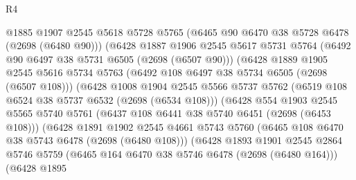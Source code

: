 \begin{lexlean}{R4}
\begin{coremodule}
                            @1885
                            @1907
                            @2545
                            @5618
                            @5728
                            @5765
                            (@6465 @90 @6470 @38 @5728 @6478 (@2698 (@6480 @90)))
                            (@6428
                              @1887
                              @1906
                              @2545
                              @5617
                              @5731
                              @5764
                              (@6492 @90 @6497 @38 @5731 @6505 (@2698 (@6507 @90)))
                              (@6428
                                @1889
                                @1905
                                @2545
                                @5616
                                @5734
                                @5763
                                (@6492 @108 @6497 @38 @5734 @6505 (@2698 (@6507 @108)))
                                (@6428
                                  @1008
                                  @1904
                                  @2545
                                  @5566
                                  @5737
                                  @5762
                                  (@6519 @108 @6524 @38 @5737 @6532 (@2698 (@6534 @108)))
                                  (@6428
                                    @554
                                    @1903
                                    @2545
                                    @5565
                                    @5740
                                    @5761
                                    (@6437 @108 @6441 @38 @5740 @6451 (@2698 (@6453 @108)))
                                    (@6428
                                      @1891
                                      @1902
                                      @2545
                                      @4661
                                      @5743
                                      @5760
                                      (@6465 @108 @6470 @38 @5743 @6478 (@2698 (@6480 @108)))
                                      (@6428
                                        @1893
                                        @1901
                                        @2545
                                        @2864
                                        @5746
                                        @5759
                                        (@6465 @164 @6470 @38 @5746 @6478 (@2698 (@6480 @164)))
                                        (@6428
                                          @1895

\end{coremodule}
\end{lexlean}
